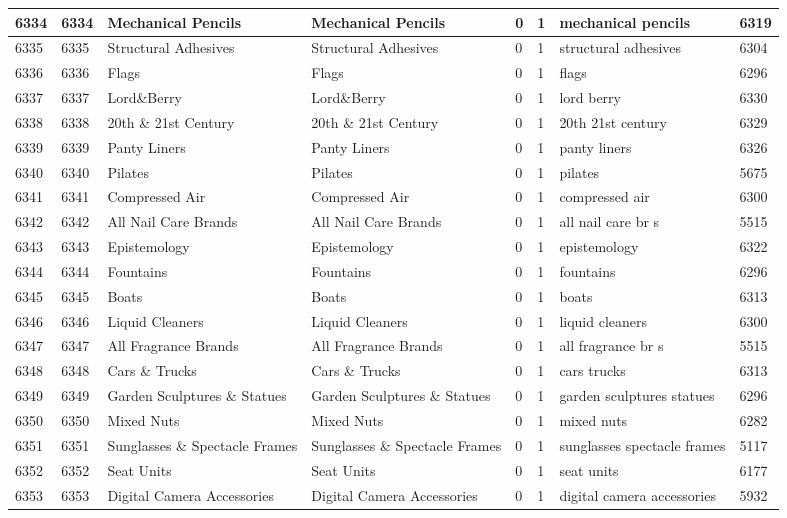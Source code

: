 \begin{longtable}{|l|l|l|l|l|l|l|l|}
6334 & 6334 & Mechanical Pencils & Mechanical Pencils & 0 & 1 & mechanical pencils & 6319 \\ \hline 
6335 & 6335 & Structural Adhesives & Structural Adhesives & 0 & 1 & structural adhesives & 6304 \\ \hline 
6336 & 6336 & Flags & Flags & 0 & 1 & flags & 6296 \\ \hline 
6337 & 6337 & Lord\&Berry & Lord\&Berry & 0 & 1 & lord berry & 6330 \\ \hline 
6338 & 6338 & 20th \& 21st Century & 20th \& 21st Century & 0 & 1 & 20th 21st century & 6329 \\ \hline 
6339 & 6339 & Panty Liners & Panty Liners & 0 & 1 & panty liners & 6326 \\ \hline 
6340 & 6340 & Pilates & Pilates & 0 & 1 & pilates & 5675 \\ \hline 
6341 & 6341 & Compressed Air & Compressed Air & 0 & 1 & compressed air & 6300 \\ \hline 
6342 & 6342 & All Nail Care Brands & All Nail Care Brands & 0 & 1 & all nail care br s & 5515 \\ \hline 
6343 & 6343 & Epistemology & Epistemology & 0 & 1 & epistemology & 6322 \\ \hline 
6344 & 6344 & Fountains & Fountains & 0 & 1 & fountains & 6296 \\ \hline 
6345 & 6345 & Boats & Boats & 0 & 1 & boats & 6313 \\ \hline 
6346 & 6346 & Liquid Cleaners & Liquid Cleaners & 0 & 1 & liquid cleaners & 6300 \\ \hline 
6347 & 6347 & All Fragrance Brands & All Fragrance Brands & 0 & 1 & all fragrance br s & 5515 \\ \hline 
6348 & 6348 & Cars \& Trucks & Cars \& Trucks & 0 & 1 & cars trucks & 6313 \\ \hline 
6349 & 6349 & Garden Sculptures \& Statues & Garden Sculptures \& Statues & 0 & 1 & garden sculptures statues & 6296 \\ \hline 
6350 & 6350 & Mixed Nuts & Mixed Nuts & 0 & 1 & mixed nuts & 6282 \\ \hline 
6351 & 6351 & Sunglasses \& Spectacle Frames & Sunglasses \& Spectacle Frames & 0 & 1 & sunglasses spectacle frames & 5117 \\ \hline 
6352 & 6352 & Seat Units & Seat Units & 0 & 1 & seat units & 6177 \\ \hline 
6353 & 6353 & Digital Camera Accessories & Digital Camera Accessories & 0 & 1 & digital camera accessories & 5932 \\ \hline 

\end{longtable}
